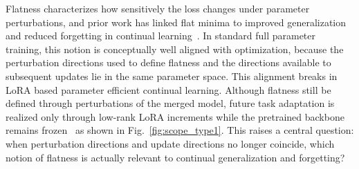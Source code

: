\documentclass[10pt]{article} %
\begin{document}
Flatness characterizes how sensitively the loss changes under parameter perturbations, and prior work has linked flat minima to improved generalization and reduced forgetting in continual learning~\cite{NEURIPS2020_518a38cc,JMLRAnEmpiricalInvestigatio,shiOvercomingCatastrophicForgetting2021,liRevisitingCatastrophicForgetting2024}.
In standard full parameter training, this notion is conceptually well aligned with optimization, because the perturbation directions used to define flatness and the directions available to subsequent updates lie in the same parameter space. 
This alignment breaks in LoRA based parameter efficient continual learning. Although flatness still be defined through perturbations of the merged model, future task adaptation is realized only through low-rank LoRA increments while the pretrained backbone remains frozen~\cite{hu2022lora} as shown in Fig.~\ref{fig:scope_type1}.  This raises a central question: when perturbation directions and update directions no longer coincide, which notion of flatness is actually relevant to continual generalization and forgetting?







\end{document}

